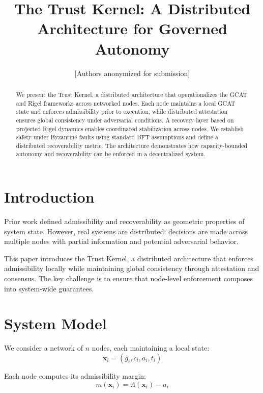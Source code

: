 \documentclass[letterpaper, 10 pt, conference]{ieeeconf}
\title{\bf The Trust Kernel: A Distributed Architecture for Governed Autonomy}
\author{[Authors anonymized for submission]}
\begin{document}
\maketitle
\thispagestyle{empty}
\pagestyle{empty}

\begin{abstract}
We present the Trust Kernel, a distributed architecture that operationalizes the GCAT and Rigel frameworks across networked nodes. Each node maintains a local GCAT state and enforces admissibility prior to execution, while distributed attestation ensures global consistency under adversarial conditions. A recovery layer based on projected Rigel dynamics enables coordinated stabilization across nodes. We establish safety under Byzantine faults using standard BFT assumptions and define a distributed recoverability metric. The architecture demonstrates how capacity-bounded autonomy and recoverability can be enforced in a decentralized system.
\end{abstract}

\section{Introduction}

Prior work defined admissibility and recoverability as geometric properties of system state. However, real systems are distributed: decisions are made across multiple nodes with partial information and potential adversarial behavior.

This paper introduces the Trust Kernel, a distributed architecture that enforces admissibility locally while maintaining global consistency through attestation and consensus. The key challenge is to ensure that node-level enforcement composes into system-wide guarantees.

\section{System Model}

We consider a network of $n$ nodes, each maintaining a local state:
\begin{equation}
\mathbf{x}_i = (g_i, c_i, a_i, t_i)
\end{equation}

Each node computes its admissibility margin:
\begin{equation}
m(\mathbf{x}_i) = \Lambda(\mathbf{x}_i) - a_i
\end{equation}
\end{document}
